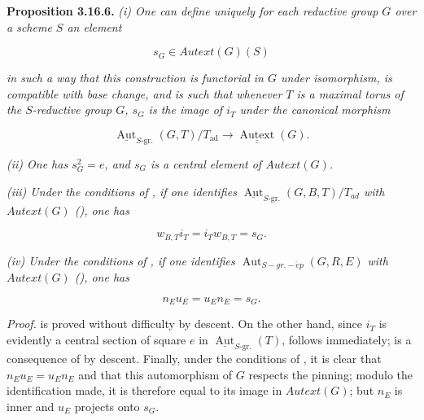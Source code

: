 \textbf{Proposition 3.16.6.} \emph{(i) One can define uniquely for each reductive group \(G\) over a scheme \(S\) an element}

\[ s_{G} \in Autext(G)(S) \]

\emph{in such a way that this construction is functorial in \(G\) under isomorphism, is compatible with base change, and is
such that whenever \(T\) is a maximal torus of the \(S\)-reductive group \(G\), \(s_{G}\) is the image of \(i_{T}\) under the
canonical morphism}

\[
  \underline{\operatorname{Aut}}_{S\text{-}\mathrm{gr.}}(G,T)/T_{\mathrm{ad}}
  \longrightarrow\underline{\underline{\operatorname{Autext}}}(G).
\]

\emph{(ii) One has \(s^{2}_{G} = e\), and \(s_{G}\) is a central element of \(Autext(G)\).}

\emph{(iii) Under the conditions of , if one identifies \(\underline{\operatorname{Aut}}_{S\text{-}\mathrm{gr.}}(G, B, T) / T_{ad}\) with
\(Autext(G)\) (), one has}

\[
  w_{B,T}i_T=i_Tw_{B,T}=s_G.
\]

\emph{(iv) Under the conditions of , if one identifies \(\operatorname{Aut}_{S-gr.-\acute{e}p}(G, R, E)\) with
\(Autext(G)\) (), one has}

\[
  n_Eu_E=u_En_E=s_G.
\]

\emph{Proof.}  is proved without difficulty by descent. On the other hand, since \(i_{T}\) is evidently a central section of
square \(e\) in \(\underline{\operatorname{Aut}}_{S\text{-}\mathrm{gr.}}(T)\),  follows immediately;  is a consequence of  by descent.
Finally, under the conditions of , it is clear that \(n_{E} u_{E} = u_{E} n_{E}\) and that this automorphism of \(G\)
respects the pinning; modulo the identification made, it is therefore equal to its image in \(Autext(G)\); but \(n_{E}\) is
inner and \(u_{E}\) projects onto \(s_{G}\).

